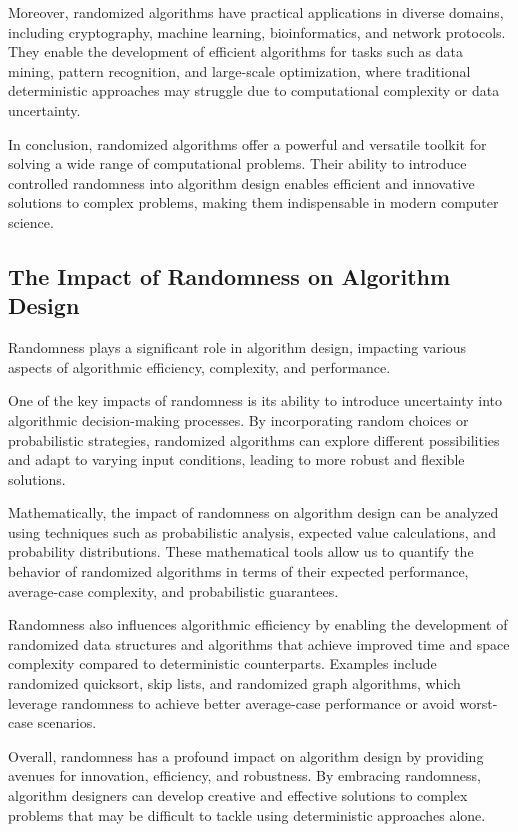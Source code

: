 \documentclass[12pt]{book} %
\begin{document}
Moreover, randomized algorithms have practical applications in diverse domains, including cryptography, machine learning, bioinformatics, and network protocols. They enable the development of efficient algorithms for tasks such as data mining, pattern recognition, and large-scale optimization, where traditional deterministic approaches may struggle due to computational complexity or data uncertainty.

In conclusion, randomized algorithms offer a powerful and versatile toolkit for solving a wide range of computational problems. Their ability to introduce controlled randomness into algorithm design enables efficient and innovative solutions to complex problems, making them indispensable in modern computer science.

\subsection{The Impact of Randomness on Algorithm Design}

Randomness plays a significant role in algorithm design, impacting various aspects of algorithmic efficiency, complexity, and performance. 

One of the key impacts of randomness is its ability to introduce uncertainty into algorithmic decision-making processes. By incorporating random choices or probabilistic strategies, randomized algorithms can explore different possibilities and adapt to varying input conditions, leading to more robust and flexible solutions.

Mathematically, the impact of randomness on algorithm design can be analyzed using techniques such as probabilistic analysis, expected value calculations, and probability distributions. These mathematical tools allow us to quantify the behavior of randomized algorithms in terms of their expected performance, average-case complexity, and probabilistic guarantees.

Randomness also influences algorithmic efficiency by enabling the development of randomized data structures and algorithms that achieve improved time and space complexity compared to deterministic counterparts. Examples include randomized quicksort, skip lists, and randomized graph algorithms, which leverage randomness to achieve better average-case performance or avoid worst-case scenarios.

Overall, randomness has a profound impact on algorithm design by providing avenues for innovation, efficiency, and robustness. By embracing randomness, algorithm designers can develop creative and effective solutions to complex problems that may be difficult to tackle using deterministic approaches alone.
\end{document}
